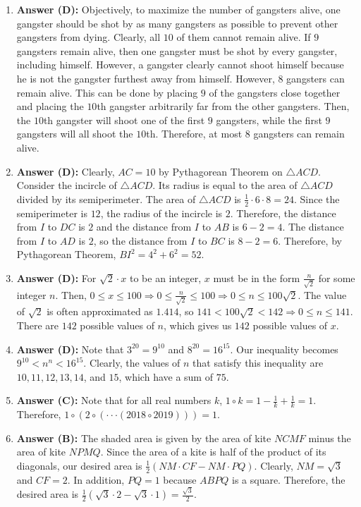 \documentclass[12pt]{scrartcl}
\begin{document}
\begin{enumerate}
\item \textbf{Answer (D):} Objectively, to maximize the number of gangsters alive, one gangster should be shot by as many gangsters as possible to prevent other gangsters from dying. Clearly, all $10$ of them cannot remain alive. If $9$ gangsters remain alive, then one gangster must be shot by every gangster, including himself. However, a gangster clearly cannot shoot himself because he is not the gangster furthest away from himself. However, $8$ gangsters can remain alive. This can be done by placing $9$ of the gangsters close together and placing the $10$th gangster arbitrarily far from the other gangsters. Then, the $10$th gangster will shoot one of the first $9$ gangsters, while the first $9$ gangsters will all shoot the $10$th. Therefore, at most $8$ gangsters can remain alive.

\item \textbf{Answer (D):} Clearly, $AC=10$ by Pythagorean Theorem on $\triangle ACD$. Consider the incircle of $\triangle ACD$. Its radius is equal to the area of $\triangle ACD$ divided by its semiperimeter. The area of $\triangle ACD$ is $\frac{1}{2}\cdot6\cdot8=24$. Since the semiperimeter is $12$, the radius of the incircle is $2$. Therefore, the distance from $I$ to $DC$ is $2$ and the distance from $I$ to $AB$ is $6-2=4$. The distance from $I$ to $AD$ is $2$, so the distance from $I$ to $BC$ is $8-2=6$. Therefore, by Pythagorean Theorem, $BI^{2}=4^{2}+6^{2}=52$.

\item \textbf{Answer (D):} For $\sqrt{2}\cdot x$ to be an integer, $x$ must be in the form $\frac{n}{\sqrt{2}}$ for some integer $n$. Then, $0\le x\le100\Rightarrow0\le\frac{n}{\sqrt{2}}\le100\Rightarrow0\le n\le100\sqrt{2}$. The value of $\sqrt{2}$ is often approximated as $1.414$, so $141<100\sqrt{2}<142\Rightarrow0\le n\le141$. There are $142$ possible values of $n$, which gives us $142$ possible values of $x$.

\item \textbf{Answer (D):} Note that $3^{20}=9^{10}$ and $8^{20}=16^{15}$. Our inequality becomes $9^{10}<n^{n}<16^{15}$. Clearly, the values of $n$ that satisfy this inequality are $10, 11, 12, 13, 14$, and $15$, which have a sum of $75$.

\item \textbf{Answer (C):} Note that for all real numbers $k$, $1\circ k=1-\frac{1}{k}+\frac{1}{k}=1$. Therefore, $1\circ(2\circ(\cdot\cdot\cdot(2018\circ2019)))=1$.

\item \textbf{Answer (B):} The shaded area is given by the area of kite $NCMF$ minus the area of kite $NPMQ$. Since the area of a kite is half of the product of its diagonals, our desired area is $\frac{1}{2}(NM\cdot CF-NM\cdot PQ)$. Clearly, $NM=\sqrt{3}$ and $CF=2$. In addition, $PQ=1$ because $ABPQ$ is a square. Therefore, the desired area is $\frac{1}{2}(\sqrt{3}\cdot2-\sqrt{3}\cdot1)=\frac{\sqrt{3}}{2}$.


\end{enumerate}
\end{document}
